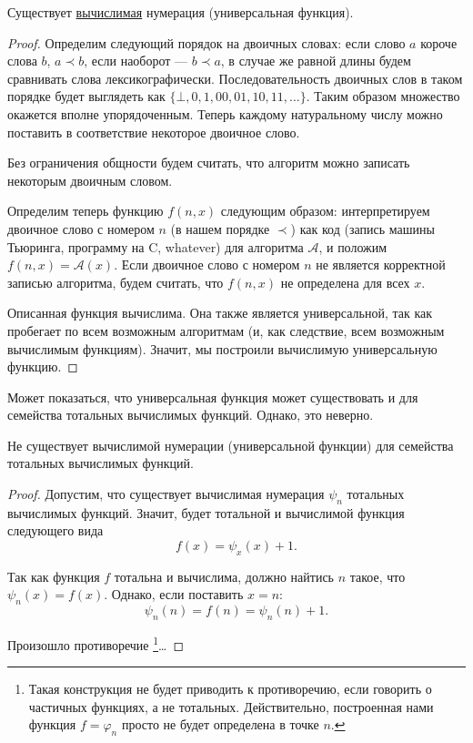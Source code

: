 \documentclass{article}
\begin{document}
    \begin{theorem}
        Существует \underline{вычислимая} нумерация (универсальная функция).
    \end{theorem}

    \begin{proof}
        Определим следующий порядок на двоичных словах: если слово $a$ короче слова $b$, $a \prec
        b$, если наоборот --- $b \prec a$, в случае же равной длины будем сравнивать слова
        лексикографически. Последовательность двоичных слов в таком порядке будет выглядеть как
        $\{\bot, 0, 1, 00, 01, 10, 11, \ldots\}$. Таким образом множество окажется вполне упорядоченным.
        Теперь каждому натуральному числу можно поставить в соответствие некоторое двоичное слово.

        Без ограничения общности будем считать, что алгоритм можно записать некоторым двоичным
        словом.

        Определим теперь функцию $f(n, x)$ следующим образом: интерпретируем двоичное слово
        с номером $n$ (в нашем порядке $\prec$) как код (запись машины Тьюринга, программу на C, whatever)
        для алгоритма $\mathcal{A}$, и положим $f(n, x) = \mathcal{A}(x)$. Если двоичное слово
        с номером $n$ не является корректной записью алгоритма, будем считать, что $f(n, x)$ не
        определена для всех $x$.

        Описанная функция вычислима. Она также является универсальной, так как пробегает по всем
        возможным алгоритмам (и, как следствие, всем возможным вычислимым функциям). Значит, мы
        построили вычислимую универсальную функцию.
    \end{proof}

    Может показаться, что универсальная функция может существовать и для семейства тотальных
    вычислимых функций. Однако, это неверно.

    \begin{theorem}
        Не существует вычислимой нумерации (универсальной функции) для семейства тотальных
        вычислимых функций.
    \end{theorem}
    \begin{proof}
        Допустим, что существует вычислимая нумерация $\psi_n$ тотальных вычислимых функций. Значит,
        будет тотальной и вычислимой функция следующего вида
        $$
            f(x) = \psi_x(x) + 1.
        $$

        Так как функция $f$ тотальна и вычислима, должно найтись $n$ такое, что $\psi_n(x) = f(x)$.
        Однако, если поставить $x = n$:
        $$
            \psi_n(n) = f(n) = \psi_n(n) + 1.
        $$

        Произошло противоречие \footnote{Такая конструкция не будет приводить к противоречию,
        если говорить о частичных функциях, а не тотальных. Действительно, построенная нами
        функция $f = \varphi_n$ просто не будет определена в точке $n$.}\dots

    \end{proof}
\end{document}
